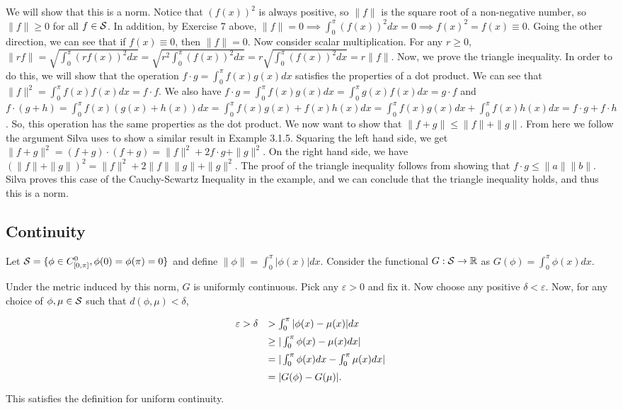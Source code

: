 \documentclass[11pt]{article}
\newcommand{\R}{\mathbb{R}}
\renewcommand{\S}{{\cal S}}
\begin{document}
We will show that this is a norm. Notice that $(f(x))^2$ is always positive, so
$\|f\|$ is the square root of a non-negative number, so $\|f\|\geq0$ for all $f\in\S$.
In addition, by Exercise 7 above,
$\|f\|=0\implies\int_0^\pi(f(x))^2dx=0\implies f(x)^2=f(x)\equiv0$.
Going the other direction, we can see that if $f(x)\equiv0$, then $\|f\|=0$.
Now consider scalar multiplication. For any $r\geq0$,
$\|rf\|=\sqrt{\int_0^\pi(rf(x))^2dx}=\sqrt{r^2\int_0^\pi(f(x))^2dx}=
r\sqrt{\int_0^\pi(f(x))^2dx}=r\|f\|$.
Now, we prove the triangle inequality. In order to do this, we will show that the
operation $f\cdot g=\int_0^\pi f(x)g(x)dx$ satisfies the properties of a dot product.
We can see that $\|f\|^2=\int_0^\pi f(x)f(x)dx=f\cdot f$. We also have
$f\cdot g=\int_0^\pi f(x)g(x)dx=\int_0^\pi g(x)f(x)dx=g\cdot f$ and
$f\cdot (g+h)=\int_0^\pi f(x)(g(x)+h(x))dx=\int_0^\pi f(x)g(x)+f(x)h(x)dx=
\int_0^\pi f(x)g(x)dx+\int_0^\pi f(x)h(x)dx=f\cdot g+f\cdot h$. So, this operation
has the same properties as the dot product. We now want to show that 
$\|f+g\|\leq\|f\|+\|g\|$. From here we follow the argument Silva uses to show a similar
result in Example 3.1.5. Squaring the left hand side, we get
$\|f+g\|^2=(f+g)\cdot(f+g)=\|f\|^2+2f\cdot g+\|g\|^2$. On the right hand side,
we have
$(\|f\|+\|g\|)^2=\|f\|^2+2\|f\|\|g\|+\|g\|^2$. The proof of the triangle inequality
follows from showing that $f\cdot g\leq\|a\|\|b\|$. Silva proves this case of
the Cauchy-Scwartz Inequality in the example, and we can conclude that
the triangle inequality holds, and thus this is a norm.

\subsection*{Continuity}

Let $\S = \{\phi\in C_{[0,\pi]}^0,\phi(0)=\phi(\pi)=0\}$ and define
$\|\phi\|=\int_0^\pi|\phi(x)|dx$. Consider the functional
$G:\S\to\R$ as $G(\phi)=\int_0^\pi\phi(x)dx$.

Under the metric induced by this norm, $G$ is uniformly continuous.
Pick any $\varepsilon>0$ and fix it. Now choose any positive $\delta<\varepsilon$.
Now, for any choice of $\phi,\mu\in\S$ such that $d(\phi,\mu)<\delta$,
\[
\def\arraystretch{1.5}
\begin{array}{rl}
\varepsilon>\delta &> \int_0^\pi|\phi(x)-\mu(x)|dx \\
&\geq |\int_0^\pi \phi(x)-\mu(x)dx| \\
&= |\int_0^\pi \phi(x)dx-\int_0^\pi\mu(x)dx| \\
&= |G(\phi)-G(\mu)|.
\end{array}
\]
This satisfies the definition for uniform continuity.
\end{document}
